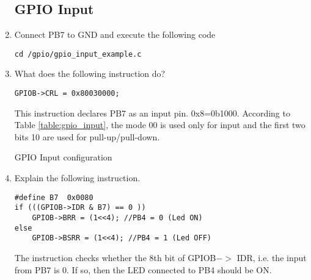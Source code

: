 \begin{enumerate}[label=\arabic*.,ref=\theenumi]
\subsection{GPIO Input}
\item Connect PB7 to GND and execute the following code
\begin{lstlisting}
cd /gpio/gpio_input_example.c
\end{lstlisting}
\item What does the following instruction do?
\begin{lstlisting}
GPIOB->CRL = 0x80030000;	
\end{lstlisting}
\solution
This instruction declares PB7 as an input pin.  0x8=0b1000.  According to Table \ref{table:gpio_input}, the mode 00 is used only for
input and the first two bits 10 are used for pull-up/pull-down.
\begin{table}[!ht]
\centering
\small

\caption{GPIO Input configuration}
\label{table:gpio_input}
\end{table}
\item Explain the following instruction.
\begin{lstlisting}
#define B7	0x0080
if (((GPIOB->IDR & B7) == 0 ))  
	GPIOB->BRR = (1<<4); //PB4 = 0 (Led ON)		
else
	GPIOB->BSRR = (1<<4); //PB4 = 1 (Led OFF)					
\end{lstlisting}
\solution The instruction checks whether the 8th bit of GPIOB$->$ IDR, i.e. the input from PB7  is 0.  If so, then the LED connected to PB4
should be ON.
\end{enumerate}
